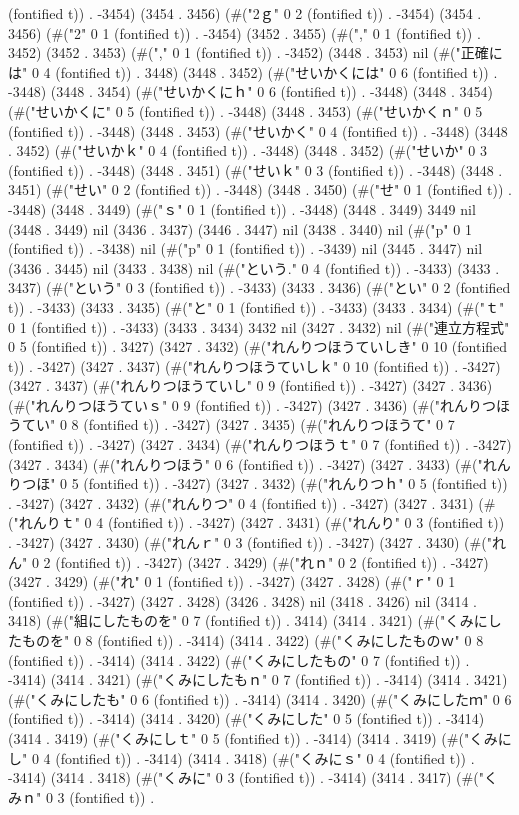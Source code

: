(fontified t)) . -3454) (3454 . 3456) (#("2ｇ" 0 2 (fontified t)) . -3454) (3454 . 3456) (#("2" 0 1 (fontified t)) . -3454) (3452 . 3455) (#("," 0 1 (fontified t)) . 3452) (3452 . 3453) (#("," 0 1 (fontified t)) . -3452) (3448 . 3453) nil (#("正確には" 0 4 (fontified t)) . 3448) (3448 . 3452) (#("せいかくには" 0 6 (fontified t)) . -3448) (3448 . 3454) (#("せいかくにｈ" 0 6 (fontified t)) . -3448) (3448 . 3454) (#("せいかくに" 0 5 (fontified t)) . -3448) (3448 . 3453) (#("せいかくｎ" 0 5 (fontified t)) . -3448) (3448 . 3453) (#("せいかく" 0 4 (fontified t)) . -3448) (3448 . 3452) (#("せいかｋ" 0 4 (fontified t)) . -3448) (3448 . 3452) (#("せいか" 0 3 (fontified t)) . -3448) (3448 . 3451) (#("せいｋ" 0 3 (fontified t)) . -3448) (3448 . 3451) (#("せい" 0 2 (fontified t)) . -3448) (3448 . 3450) (#("せ" 0 1 (fontified t)) . -3448) (3448 . 3449) (#("ｓ" 0 1 (fontified t)) . -3448) (3448 . 3449) 3449 nil (3448 . 3449) nil (3436 . 3437) (3446 . 3447) nil (3438 . 3440) nil (#("p" 0 1 (fontified t)) . -3438) nil (#("p" 0 1 (fontified t)) . -3439) nil (3445 . 3447) nil (3436 . 3445) nil (3433 . 3438) nil (#("という." 0 4 (fontified t)) . -3433) (3433 . 3437) (#("という" 0 3 (fontified t)) . -3433) (3433 . 3436) (#("とい" 0 2 (fontified t)) . -3433) (3433 . 3435) (#("と" 0 1 (fontified t)) . -3433) (3433 . 3434) (#("ｔ" 0 1 (fontified t)) . -3433) (3433 . 3434) 3432 nil (3427 . 3432) nil (#("連立方程式" 0 5 (fontified t)) . 3427) (3427 . 3432) (#("れんりつほうていしき" 0 10 (fontified t)) . -3427) (3427 . 3437) (#("れんりつほうていしｋ" 0 10 (fontified t)) . -3427) (3427 . 3437) (#("れんりつほうていし" 0 9 (fontified t)) . -3427) (3427 . 3436) (#("れんりつほうていｓ" 0 9 (fontified t)) . -3427) (3427 . 3436) (#("れんりつほうてい" 0 8 (fontified t)) . -3427) (3427 . 3435) (#("れんりつほうて" 0 7 (fontified t)) . -3427) (3427 . 3434) (#("れんりつほうｔ" 0 7 (fontified t)) . -3427) (3427 . 3434) (#("れんりつほう" 0 6 (fontified t)) . -3427) (3427 . 3433) (#("れんりつほ" 0 5 (fontified t)) . -3427) (3427 . 3432) (#("れんりつｈ" 0 5 (fontified t)) . -3427) (3427 . 3432) (#("れんりつ" 0 4 (fontified t)) . -3427) (3427 . 3431) (#("れんりｔ" 0 4 (fontified t)) . -3427) (3427 . 3431) (#("れんり" 0 3 (fontified t)) . -3427) (3427 . 3430) (#("れんｒ" 0 3 (fontified t)) . -3427) (3427 . 3430) (#("れん" 0 2 (fontified t)) . -3427) (3427 . 3429) (#("れｎ" 0 2 (fontified t)) . -3427) (3427 . 3429) (#("れ" 0 1 (fontified t)) . -3427) (3427 . 3428) (#("ｒ" 0 1 (fontified t)) . -3427) (3427 . 3428) (3426 . 3428) nil (3418 . 3426) nil (3414 . 3418) (#("組にしたものを" 0 7 (fontified t)) . 3414) (3414 . 3421) (#("くみにしたものを" 0 8 (fontified t)) . -3414) (3414 . 3422) (#("くみにしたものｗ" 0 8 (fontified t)) . -3414) (3414 . 3422) (#("くみにしたもの" 0 7 (fontified t)) . -3414) (3414 . 3421) (#("くみにしたもｎ" 0 7 (fontified t)) . -3414) (3414 . 3421) (#("くみにしたも" 0 6 (fontified t)) . -3414) (3414 . 3420) (#("くみにしたｍ" 0 6 (fontified t)) . -3414) (3414 . 3420) (#("くみにした" 0 5 (fontified t)) . -3414) (3414 . 3419) (#("くみにしｔ" 0 5 (fontified t)) . -3414) (3414 . 3419) (#("くみにし" 0 4 (fontified t)) . -3414) (3414 . 3418) (#("くみにｓ" 0 4 (fontified t)) . -3414) (3414 . 3418) (#("くみに" 0 3 (fontified t)) . -3414) (3414 . 3417) (#("くみｎ" 0 3 (fontified t)) . 